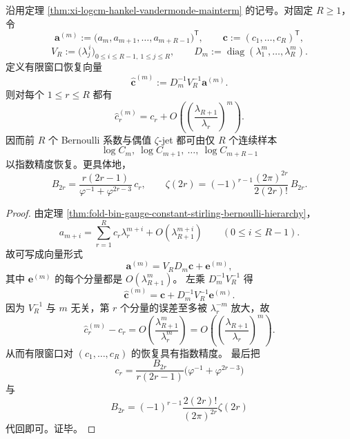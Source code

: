 \begin{corollary}\label{cor:xi-logcm-finite-window-bernoulli-recovery}
沿用定理 \ref{thm:xi-logcm-hankel-vandermonde-mainterm} 的记号。对固定 \(R\ge 1\)，令
\[
\mathbf a^{(m)}:=
\bigl(a_m,a_{m+1},\dots,a_{m+R-1}\bigr)^{\mathsf T},
\qquad
\mathbf c:=(c_1,\dots,c_R)^{\mathsf T},
\]
\[
V_R:=\bigl(\lambda_j^{\,i}\bigr)_{0\le i\le R-1,\ 1\le j\le R},
\qquad
D_m:=\operatorname{diag}(\lambda_1^m,\dots,\lambda_R^m).
\]
定义有限窗口恢复向量
\[
\widehat{\mathbf c}^{(m)}:=D_m^{-1}V_R^{-1}\mathbf a^{(m)}.
\]
则对每个 \(1\le r\le R\) 都有
\[
\boxed{\;
\widehat c_r^{(m)}=c_r+O\!\left(\left(\frac{\lambda_{R+1}}{\lambda_r}\right)^m\right).
\;}
\]
因而前 \(R\) 个 Bernoulli 系数与偶值 \(\zeta\)-jet 都可由仅 \(R\) 个连续样本
\[
\log C_m,\ \log C_{m+1},\ \dots,\ \log C_{m+R-1}
\]
以指数精度恢复。更具体地，
\[
B_{2r}=
\frac{r(2r-1)}{\varphi^{-1}+\varphi^{2r-3}}\,c_r,
\qquad
\zeta(2r)=(-1)^{r-1}\frac{(2\pi)^{2r}}{2(2r)!}\,B_{2r}.
\]
\end{corollary}
\begin{proof}
由定理 \ref{thm:fold-bin-gauge-constant-stirling-bernoulli-hierarchy}，
\[
a_{m+i}=\sum_{r=1}^{R}c_r\lambda_r^{m+i}+O(\lambda_{R+1}^{m+i})
\qquad (0\le i\le R-1).
\]
故可写成向量形式
\[
\mathbf a^{(m)}=V_R D_m \mathbf c+\mathbf e^{(m)},
\]
其中 \(\mathbf e^{(m)}\) 的每个分量都是 \(O(\lambda_{R+1}^{m})\)。
左乘 \(D_m^{-1}V_R^{-1}\) 得
\[
\widehat{\mathbf c}^{(m)}
=
\mathbf c+D_m^{-1}V_R^{-1}\mathbf e^{(m)}.
\]
因为 \(V_R^{-1}\) 与 \(m\) 无关，第 \(r\) 个分量的误差至多被 \(\lambda_r^{-m}\) 放大，故
\[
\widehat c_r^{(m)}-c_r=
O\!\left(\frac{\lambda_{R+1}^m}{\lambda_r^m}\right)
=
O\!\left(\left(\frac{\lambda_{R+1}}{\lambda_r}\right)^m\right).
\]
从而有限窗口对 \((c_1,\dots,c_R)\) 的恢复具有指数精度。
最后把
\[
c_r=\frac{B_{2r}}{r(2r-1)}\bigl(\varphi^{-1}+\varphi^{2r-3}\bigr)
\]
与
\[
B_{2r}=(-1)^{r-1}\frac{2(2r)!}{(2\pi)^{2r}}\zeta(2r)
\]
代回即可。证毕。
\end{proof}

\endinput
